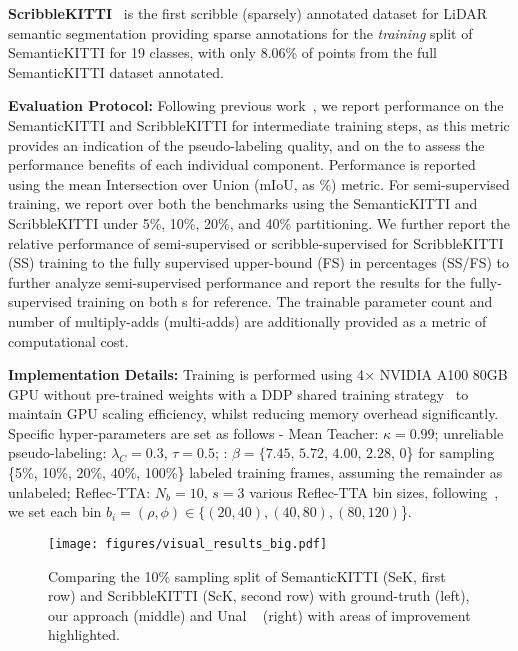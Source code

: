 \documentclass[10pt,twocolumn,letterpaper]{article}
\newcommand\bdtitle[1]{\noindent\textbf{#1}}
\begin{document}
\bdtitle{ScribbleKITTI}~\cite{Unal_2022_CVPR} is the first scribble (\ie sparsely) annotated dataset for LiDAR semantic segmentation providing sparse annotations for the \textit{training} split of SemanticKITTI for 19 classes, with only 8.06\% of points from the full SemanticKITTI dataset annotated.

\bdtitle{Evaluation Protocol:} Following previous work~\cite{zhu2021cylindrical,jiang2021guided,Unal_2022_CVPR,kong2022lasermix}, we report performance on the SemanticKITTI and ScribbleKITTI {\trainset} for intermediate training steps, as this metric provides an indication of the pseudo-labeling quality, and on the {\validset} to assess the performance benefits of each individual component. Performance is reported using the mean Intersection over Union (mIoU, as \%) metric. For semi-supervised training, we report over both the benchmarks using the SemanticKITTI and ScribbleKITTI {\validset} under 5\%, 10\%, 20\%, and 40\% partitioning. We further report the relative performance of semi-supervised or scribble-supervised for ScribbleKITTI (SS) training to the fully supervised upper-bound (FS) in percentages (SS/FS) to further analyze semi-supervised performance and report the results for the fully-supervised training on both {\validset}s for reference. The trainable parameter count and number of multiply-adds (multi-adds) are additionally provided as a metric of computational cost.

\bdtitle{Implementation Details:} Training is performed using 4$\times$ NVIDIA A100 80GB GPU without pre-trained weights with a DDP shared training strategy~\cite{FairScale2021} to maintain GPU scaling efficiency, whilst reducing memory overhead significantly. Specific hyper-parameters are set as follows - Mean Teacher: $\kappa=0.99$; unreliable pseudo-labeling: $\lambda_C=0.3$, $\tau=0.5$; {\samplshort}: $\beta = \{7.45$, $5.72$, $4.00$, $2.28$, $0$\} for sampling \{5\%, 10\%, 20\%, 40\%, 100\%\} labeled training frames, assuming the remainder as unlabeled; Reflec-TTA: $N_b=10$, $s=3$ various Reflec-TTA bin sizes, following~\cite{Unal_2022_CVPR}, we set each bin $b_i = \left(\rho, \phi\right) \in \{ (20, 40), (40, 80), (80, 120)$\}.




\begin{figure}[thp]
    \centering
    \texttt{[image: figures/visual\_results\_big.pdf]}
    \caption{Comparing the 10\% sampling split of SemanticKITTI (SeK, first row) and ScribbleKITTI (ScK, second row) {\validset} with ground-truth (left), our approach (middle) and Unal \etal~\cite{Unal_2022_CVPR} (right) with areas of improvement highlighted.}
    \label{fig:visual_results}
    \vspace{-0.4cm}
\end{figure}
\end{document}
